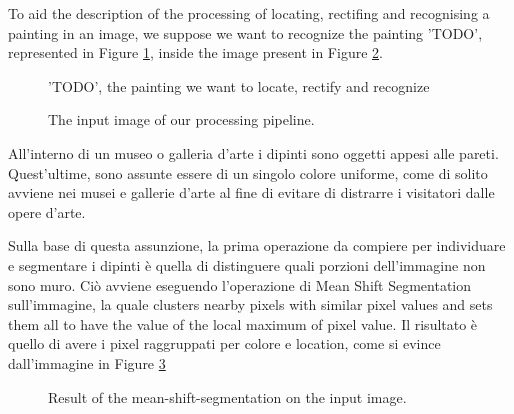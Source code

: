 \documentclass[10pt,twocolumn,letterpaper]{article}
\begin{document}
To aid the description of the processing of locating, rectifing and recognising a painting in an image, we suppose we want to recognize the painting 'TODO', represented in Figure \ref{fig:dbPainting}, inside the image present in Figure \ref{fig:originalImage}.

\begin{figure}[t]
   \begin{center}
   \fbox{\rule{0pt}{2in} \rule{0.9\linewidth}{0pt}}
   \end{center}
      \caption{'TODO', the painting we want to locate, rectify and recognize}
   \label{fig:dbPainting}
   \end{figure}

\begin{figure}[t]
   \begin{center}
   \fbox{\rule{0pt}{2in} \rule{0.9\linewidth}{0pt}}
   \end{center}
      \caption{The input image of our processing pipeline.}
   \label{fig:originalImage}
\end{figure}

All'interno di un museo o galleria d'arte i dipinti sono oggetti appesi alle pareti. Quest'ultime, sono assunte essere di un singolo colore uniforme, come di solito avviene nei musei e gallerie d'arte al fine di evitare di distrarre i visitatori dalle opere d'arte. 

Sulla base di questa assunzione, la prima operazione da compiere per individuare e segmentare i dipinti è quella di distinguere quali porzioni dell'immagine non sono muro. Ciò avviene eseguendo l'operazione di Mean Shift Segmentation sull'immagine, la quale clusters nearby pixels with similar pixel values and sets them all to have the value of the local maximum of pixel value. Il risultato è quello di avere i pixel raggruppati per colore e location, come si evince dall'immagine in Figure \ref{fig:meanShiftSegmentation}

\begin{figure}[t]
   \begin{center}
   \fbox{\rule{0pt}{2in} \rule{0.9\linewidth}{0pt}}
   \end{center}
      \caption{Result of the mean-shift-segmentation on the input image.}
   \label{fig:meanShiftSegmentation}
\end{figure}
\end{document}
